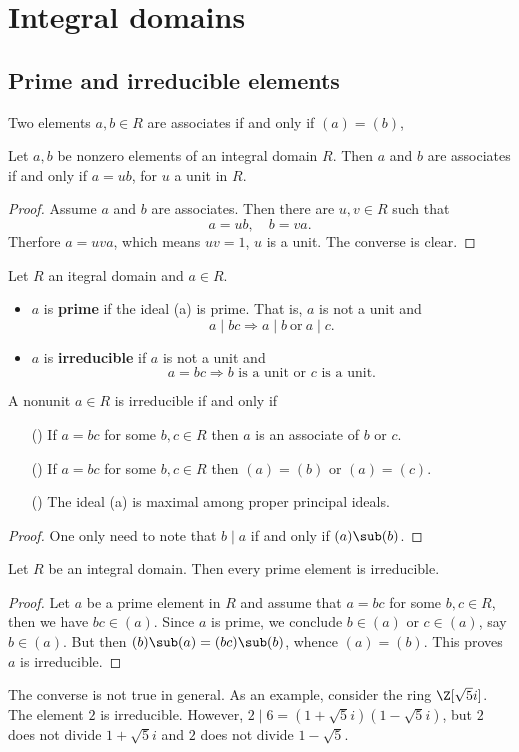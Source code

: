 \chapter{Integral domains}
\section{Prime and irreducible elements}
Two elements $a,b\in R$ are associates if and only if $(a)=(b)$,
\begin{lemma}
Let $a,b$ be nonzero elements of an integral domain $R$. Then $a$ and $b$ are associates if and only if $a=ub$, for $u$ a unit in $R$.
\end{lemma}
\begin{proof}
Assume $a$ and $b$ are associates. Then there are $u,v\in R$ such that
\[a=ub,\quad b=va.\]
Therfore $a=uva$, which means $uv=1$, $u$ is a unit. The converse is clear.
\end{proof}
\begin{definition}
Let $R$ an itegral domain and $a\in R$.
\begin{itemize}
\item $a$ is \textbf{prime} if the ideal (a) is prime. That is, $a$ is not a unit and \[a\mid bc \Rightarrow a\mid b\ \text{or}\ a\mid c.\]
\item $a$ is \textbf{irreducible} if $a$ is not a unit and 
\[a=bc \Rightarrow \text{$b$ is a unit or $c$ is a unit}.\]
\end{itemize}
\end{definition}
\begin{proposition}
A nonunit $a\in R$ is irreducible if and only if
\begin{itemize}
\item[(\rmnum{1})] If $a=bc$ for some $b,c\in R$ then $a$ is an associate of $b$ or $c$.
\item[(\rmnum{2})] If $a=bc$ for some $b,c\in R$ then $(a)=(b)$ or $(a)=(c)$.
\item[(\rmnum{3})] The ideal (a) is maximal among proper principal ideals.
\end{itemize}
\end{proposition}
\begin{proof}
One only need to note that $b\mid a$ if and only if $(a)\sub(b)$.
\end{proof}
\begin{lemma}
Let $R$ be an integral domain. Then every prime element is irreducible.
\end{lemma}
\begin{proof}
Let $a$ be a prime element in $R$ and assume that $a=bc$ for some $b,c\in R$, then we have $bc\in(a)$. Since $a$ is prime, we conclude $b\in (a)$ or $c\in(a)$, say $b\in(a)$. But then $(b)\sub(a)=(bc)\sub(b)$, whence $(a)=(b)$. This proves $a$ is irreducible.
\end{proof}
\begin{example}
The converse is not true in general. As an example, consider the ring $\Z[\sqrt{5}i]$. The element $2$ is irreducible. However, $2\mid 6=(1+\sqrt{5}i)(1-\sqrt{5}i)$, but $2$ does not divide $1+\sqrt{5}i$ and $2$ does not divide $1-\sqrt{5}$.
\end{example}
